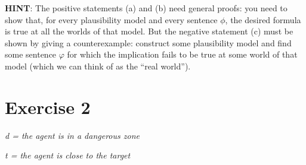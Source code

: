 \documentclass[leqno]{article}
\begin{document}
\textbf{HINT}: The positive statements (a) and (b) need general proofs: you
need to show that, for every plausibility model and every sentence $\phi$, the
desired formula is true at all the worlds of that model. But the negative
statement (c) must be shown by giving a counterexample: construct some
plausibility model and find some sentence $\varphi$ for which the implication
fails to be true at some world of that model (which we can think of as the
“real world”).

\pagebreak
\section*{Exercise 2}

\textit{d = the agent is in a dangerous zone}

\textit{t = the agent is close to the target}

\end{document}
